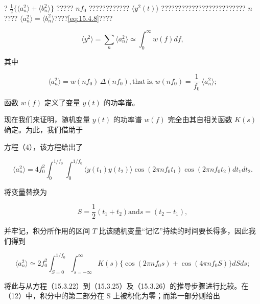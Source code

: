 ? \(\frac{1}{2}\{\langle a_{n}^{2}\rangle+\langle b_{n}^{2}\rangle\}\) ????? \(nf_{0}\) ???????????? \(\langle y^{2}(t)\rangle\) ????????????????????????? \(n\)???? \(\langle a_{n}^{2}\rangle=\langle b_{n}^{2}\rangle\)????\autoref{eq:15.4.8}????

\begin{equation}\tag{15.4.28}\label{eq:15.4.28}
\langle y ^{2} \rangle = \sum _ { n } \langle a _ { n } ^{2} \rangle \simeq \int _ { 0 } ^{\infty} w ( f ) d f ,
\end{equation}

其中

\begin{equation}\tag{15.4.29}\label{eq:15.4.29}
\langle a _ { n } ^{2} \rangle = w ( n f _ { 0 } ) \, \Delta ( n f _ { 0 } ) ,  \mathrm { t h a t ~ i s , }  w ( n f _ { 0 } ) = \frac { 1 } { f _ { 0 } } \, \langle a _ { n } ^{2} \rangle ;
\end{equation}

函数 \(w(f)\) 定义了变量 \(y(t)\) 的功率谱。

现在我们来证明，随机变量 \(y(t)\) 的功率谱 \(w(f)\) 完全由其自相关函数 \(K(s)\) 确定。为此，我们借助于

方程（4），该方程给出了

\begin{equation}\tag{15.4.30}\label{eq:15.4.30}
\langle a _ { n } ^{2} \rangle = 4 f _ { 0 } ^{2} \int _ { 0 } ^{1 / f _ { 0} } \int _ { 0 } ^{1 / f _ { 0} } \langle y ( t _ { 1 } ) y ( t _ { 2 } ) \rangle \cos ( 2 \pi n f _ { 0 } t _ { 1 } ) \cos ( 2 \pi n f _ { 0 } t _ { 2 } ) d t _ { 1 } d t _ { 2 } .
\end{equation}

将变量替换为

\begin{equation}\tag{15.4.31}\label{eq:15.4.31}
S = \frac { 1 } { 2 } ( t _ { 1 } + t _ { 2 } )  \mathrm { a n d }  s = ( t _ { 2 } - t _ { 1 } ) ,
\end{equation}

并牢记，积分所作用的区间 \(T\) 比该随机变量``记忆''持续的时间要长得多，因此我们得到

\begin{equation}\tag{15.4.32}\label{eq:15.4.32}
\langle a _ { n } ^{2} \rangle \simeq 2 f _ { 0 } ^{2} \int _ { S = 0 } ^{1 / f _ { 0} } \int _ { s = - \infty } ^{\infty} K ( s ) \{ \cos ( 2 \pi n f _ { 0 } s ) + \cos ( 4 \pi n f _ { 0 } S ) \} d S d s ;
\end{equation}

将此与从方程（15.3.22）到（15.3.25）及（15.3.26）的推导步骤进行比较。在（12）中，积分中的第二部分在 S 上被积化为零；而第一部分则给出

